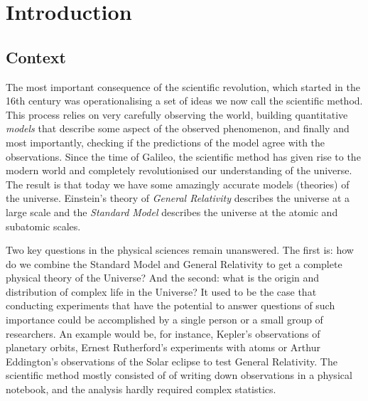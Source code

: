 \documentclass[12pt,dvipsnames]{report}
\begin{document}
\chapter{Introduction}
\section{Context}


The most important consequence of the scientific revolution, which started in the 16th 
century was operationalising a set of ideas we now call the scientific method.
This process relies on very carefully observing the world, building quantitative 
\emph{models} that describe some aspect 
of the observed phenomenon, and finally and most importantly, checking if the predictions 
of the model agree with the observations.
Since the time of Galileo, the scientific method has given rise to the modern world 
and completely revolutionised our understanding of the universe. The result 
is that today we have some amazingly accurate models (theories) of the universe.
Einstein's theory of \emph{General Relativity} describes the
universe at a large scale and the \emph{Standard Model} describes the
universe at the atomic and subatomic scales. 

Two key questions in the physical sciences remain unanswered. 
The first is: how do we combine the Standard Model and General Relativity to get a complete
physical theory of the Universe? And the second: what is the origin and distribution of complex 
life in the Universe?
It used to be the case that conducting experiments that have the potential to 
answer questions of such importance could be accomplished by a single person or  
a small group of researchers. 
An example would be, for instance, Kepler's observations of planetary orbits, Ernest
Rutherford's experiments with atoms or Arthur Eddington's observations of the
Solar eclipse to test General Relativity. The scientific method mostly consisted of 
of writing down observations in a physical notebook, and the analysis
hardly required complex statistics. 
\end{document}
